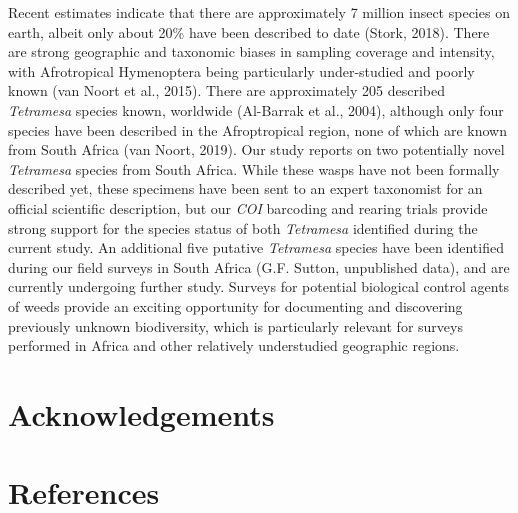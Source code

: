\documentclass[12pt,]{article}
\begin{document}
Recent estimates indicate that there are approximately 7 million insect
species on earth, albeit only about 20\% have been described to date
(Stork, 2018). There are strong geographic and taxonomic biases in
sampling coverage and intensity, with Afrotropical Hymenoptera being
particularly under-studied and poorly known (van Noort et al., 2015).
There are approximately 205 described \emph{Tetramesa} species known,
worldwide (Al-Barrak et al., 2004), although only four species have been
described in the Afroptropical region, none of which are known from
South Africa (van Noort, 2019). Our study reports on two potentially
novel \emph{Tetramesa} species from South Africa. While these wasps have
not been formally described yet, these specimens have been sent to an
expert taxonomist for an official scientific description, but our
\emph{COI} barcoding and rearing trials provide strong support for the
species status of both \emph{Tetramesa} identified during the current
study. An additional five putative \emph{Tetramesa} species have been
identified during our field surveys in South Africa (G.F. Sutton,
unpublished data), and are currently undergoing further study. Surveys
for potential biological control agents of weeds provide an exciting
opportunity for documenting and discovering previously unknown
biodiversity, which is particularly relevant for surveys performed in
Africa and other relatively understudied geographic regions.

\hypertarget{acknowledgements}{%
\section{Acknowledgements}\label{acknowledgements}}

\newpage

\hypertarget{references}{%
\section{References}\label{references}}

\setlength{\parindent}{-0.2in}
\setlength{\leftskip}{0.2in}
\setlength{\parskip}{8pt}
\vspace*{-0.2in}

\noindent

\newlength{\cslhangindent}
\setlength{\cslhangindent}{1.5em}
\newenvironment{CSLReferences}%
{\setlength{\parindent}{0pt}%
\everypar{\setlength{\hangindent}{\cslhangindent}}\ignorespaces}%
{\par}
\end{document}
